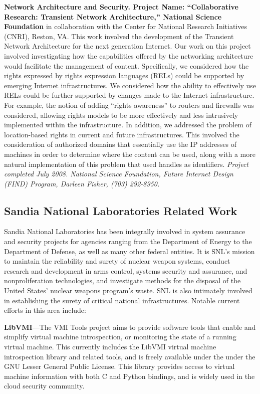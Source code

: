 \documentclass{sbir}
\begin{document}
{\bf Network Architecture and Security. Project Name: ``Collaborative Research: Transient Network Architecture,'' National Science Foundation} in collaboration with the Center for National Research Initiatives (CNRI), Reston, VA. This work involved the development of the Transient Network Architecture for the next generation Internet. Our work on this project involved investigating how the capabilities offered by the networking architecture would facilitate the management of content. Specifically, we considered how the rights expressed by rights expression languages (RELs) could be supported by emerging Internet infrastructures. We considered how the ability to effectively use RELs could be further supported by changes made to the Internet infrastructure. For example, the notion of adding ``rights awareness'' to routers and firewalls was considered, allowing rights models to be more effectively and less intrusively implemented within the infrastructure. In addition, we addressed the problem of location-based rights in current and future infrastructures. This involved the consideration of authorized domains that essentially use the IP addresses of machines in order to determine where the content can be used, along with a more natural implementation of this problem that used handles as identifiers. \emph{Project completed July 2008. National Science Foundation, Future Internet Design (FIND) Program, Darleen Fisher, (703) 292-8950.}

\subsection{Sandia National Laboratories Related Work}
Sandia National Laboratories has been integrally involved in system assurance and security projects for agencies ranging from the Department of Energy to the Department of Defense, as well as many other federal entities. It is SNL's mission to maintain the reliability and surety of nuclear weapon systems, conduct research and development in arms control, systems security and assurance, and nonproliferation technologies, and investigate methods for the disposal of the United States' nuclear weapons program's waste. SNL is also intimately involved in establishing the surety of critical national infrastructures. Notable current efforts in this area include:

{\bf LibVMI}---The VMI Tools project aims to provide software tools that enable and simplify virtual machine introspection, or monitoring the state of a running virtual machine. This currently includes the LibVMI virtual machine introspection library and related tools, and is freely available under the under the GNU Lesser General Public License. This library provides access to virtual machine information with both C and Python bindings, and is widely used in the cloud security community.
\end{document}
